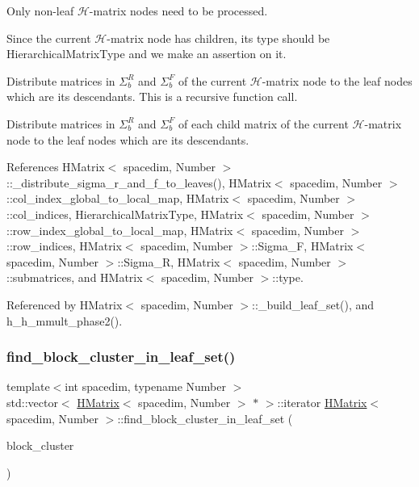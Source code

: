 Only non-\/leaf $\mathcal{H}$-\/matrix nodes need to be processed.

Since the current $\mathcal{H}$-\/matrix node has children, its type should be {\ttfamily Hierarchical\+Matrix\+Type} and we make an assertion on it.

Distribute matrices in $\Sigma_b^R$ and $\Sigma_b^F$ of the current $\mathcal{H}$-\/matrix node to the leaf nodes which are its descendants. This is a recursive function call.

Distribute matrices in $\Sigma_b^R$ and $\Sigma_b^F$ of each child matrix of the current $\mathcal{H}$-\/matrix node to the leaf nodes which are its descendants.

References H\+Matrix$<$ spacedim, Number $>$\+::\+\_\+distribute\+\_\+sigma\+\_\+r\+\_\+and\+\_\+f\+\_\+to\+\_\+leaves(), H\+Matrix$<$ spacedim, Number $>$\+::col\+\_\+index\+\_\+global\+\_\+to\+\_\+local\+\_\+map, H\+Matrix$<$ spacedim, Number $>$\+::col\+\_\+indices, Hierarchical\+Matrix\+Type, H\+Matrix$<$ spacedim, Number $>$\+::row\+\_\+index\+\_\+global\+\_\+to\+\_\+local\+\_\+map, H\+Matrix$<$ spacedim, Number $>$\+::row\+\_\+indices, H\+Matrix$<$ spacedim, Number $>$\+::\+Sigma\+\_\+F, H\+Matrix$<$ spacedim, Number $>$\+::\+Sigma\+\_\+R, H\+Matrix$<$ spacedim, Number $>$\+::submatrices, and H\+Matrix$<$ spacedim, Number $>$\+::type.



Referenced by H\+Matrix$<$ spacedim, Number $>$\+::\+\_\+build\+\_\+leaf\+\_\+set(), and h\+\_\+h\+\_\+mmult\+\_\+phase2().

\mbox{\label{classHMatrix_ab0f83de878e6079330ec3c374f587a04}} 
\subsubsection{\texorpdfstring{find\+\_\+block\+\_\+cluster\+\_\+in\+\_\+leaf\+\_\+set()}{find\_block\_cluster\_in\_leaf\_set()}\hspace{0.1cm}{\footnotesize\ttfamily [1/2]}}
{\footnotesize\ttfamily template$<$int spacedim, typename Number $>$ \\
std\+::vector$<$ \hyperlink{classHMatrix}{H\+Matrix}$<$ spacedim, Number $>$ $\ast$ $>$\+::iterator \hyperlink{classHMatrix}{H\+Matrix}$<$ spacedim, Number $>$\+::find\+\_\+block\+\_\+cluster\+\_\+in\+\_\+leaf\+\_\+set (\begin{DoxyParamCaption}\item[{const \hyperlink{classBlockCluster}{Block\+Cluster}$<$ spacedim, Number $>$ \&}]{block\+\_\+cluster }\end{DoxyParamCaption})}

